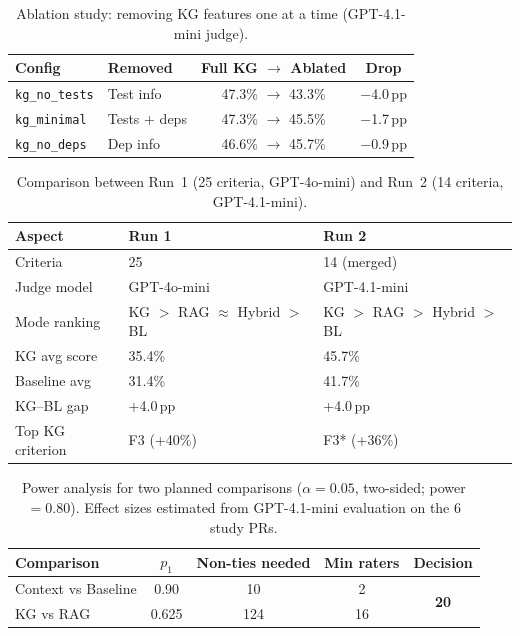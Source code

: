
\begin{table}[t]
\centering
\caption{Ablation study: removing KG features one at a time (GPT-4.1-mini judge).}
\label{tab:ablation}
\begin{tabular}{llcc}
\toprule
\textbf{Config} & \textbf{Removed} & \textbf{Full KG $\to$ Ablated} & \textbf{Drop} \\
\midrule
\texttt{kg\_no\_tests} & Test info    & 47.3\% $\to$ 43.3\% & $-$4.0\,pp \\
\texttt{kg\_minimal}   & Tests + deps & 47.3\% $\to$ 45.5\% & $-$1.7\,pp \\
\texttt{kg\_no\_deps}  & Dep info     & 46.6\% $\to$ 45.7\% & $-$0.9\,pp \\
\bottomrule
\end{tabular}
\end{table}



\begin{table}[t]
\centering
\caption{Comparison between Run~1 (25 criteria, GPT-4o-mini) and Run~2 (14 criteria, GPT-4.1-mini).}
\label{tab:run-comparison}
\begin{tabular}{lll}
\toprule
\textbf{Aspect} & \textbf{Run 1} & \textbf{Run 2} \\
\midrule
Criteria         & 25                      & 14 (merged) \\
Judge model      & GPT-4o-mini             & GPT-4.1-mini \\
Mode ranking     & KG $>$ RAG $\approx$ Hybrid $>$ BL & KG $>$ RAG $>$ Hybrid $>$ BL \\
KG avg score     & 35.4\%                  & 45.7\% \\
Baseline avg     & 31.4\%                  & 41.7\% \\
KG--BL gap       & +4.0\,pp                & +4.0\,pp \\
Top KG criterion & F3 (+40\%)              & F3* (+36\%) \\
\bottomrule
\end{tabular}
\end{table}



\begin{table}[t]
\centering
\caption{Power analysis for two planned comparisons ($\alpha = 0.05$, two-sided; power $= 0.80$). Effect sizes estimated from GPT-4.1-mini evaluation on the 6 study PRs.}
\label{tab:power-analysis}
\begin{tabular}{lcccc}
\toprule
\textbf{Comparison} & $p_1$ & \textbf{Non-ties needed} & \textbf{Min raters} & \textbf{Decision} \\
\midrule
Context vs Baseline & 0.90 & 10 & 2  & \multirow{2}{*}{\textbf{20}} \\
KG vs RAG           & 0.625 & 124 & 16 & \\
\bottomrule
\end{tabular}
\end{table}


